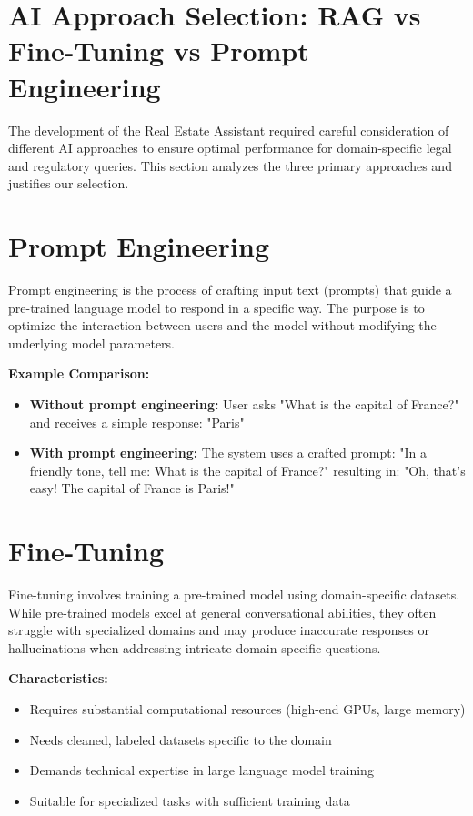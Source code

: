 \section{AI Approach Selection: RAG vs Fine-Tuning vs Prompt Engineering}
\label{app:E}

The development of the Real Estate Assistant required careful consideration of different AI approaches to ensure optimal performance for domain-specific legal and regulatory queries. This section analyzes the three primary approaches and justifies our selection.

\section*{Prompt Engineering}

Prompt engineering is the process of crafting input text (prompts) that guide a pre-trained language model to respond in a specific way. The purpose is to optimize the interaction between users and the model without modifying the underlying model parameters.

\textbf{Example Comparison:}
\begin{itemize}
    \item \textbf{Without prompt engineering:} User asks "What is the capital of France?" and receives a simple response: "Paris"
    \item \textbf{With prompt engineering:} The system uses a crafted prompt: "In a friendly tone, tell me: What is the capital of France?" resulting in: "Oh, that's easy! The capital of France is Paris!"
\end{itemize}

\section*{Fine-Tuning}

Fine-tuning involves training a pre-trained model using domain-specific datasets. While pre-trained models excel at general conversational abilities, they often struggle with specialized domains and may produce inaccurate responses or hallucinations when addressing intricate domain-specific questions.

\textbf{Characteristics:}
\begin{itemize}
    \item Requires substantial computational resources (high-end GPUs, large memory)
    \item Needs cleaned, labeled datasets specific to the domain
    \item Demands technical expertise in large language model training
    \item Suitable for specialized tasks with sufficient training data
\end{itemize}

